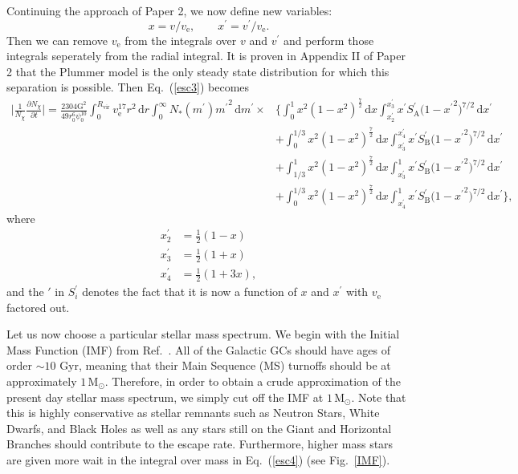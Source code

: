 \documentclass[aps,floatfix,prd,showpacs]{revtex4}
\newcommand{\diff}{\mathrm{d}}
\newcommand{\vesc}{v_{\text{e}}}
\newcommand{\vp}{v^\prime}
\newcommand{\mpr}{m^\prime}
\newcommand{\xp}{x^\prime}
\newcommand{\SA}{S_{\text{A}}}
\newcommand{\SB}{S_{\text{B}}}
\newcommand{\G}{\text{G}}
\newcommand{\Nx}{N_\chi}
\newcommand{\Rvir}{R_{\mathrm{vir}}}
\newcommand{\Msun}{\textrm{M}_\odot}
\begin{document}
Continuing the approach of Paper 2, we now define new variables: 
%
\begin{equation} 
	x = v/\vesc, \qquad \xp = \vp/\vesc.	
\end{equation}
%
%
Then we can remove $\vesc$ from the integrals over $v$ and $\vp$ and perform those integrals seperately from the radial integral.  It is proven in Appendix II of Paper 2 that the Plummer model is the only steady state distribution for which this separation is possible.  Then Eq.~(\ref{esc3}) becomes
%
\begin{equation}
\label{esc4}
\begin{split}
\bigg|\frac{1}{\Nx}\frac{\partial \Nx}{\partial t}\bigg| = \frac{2304\G^2}{49 r_0^6\psi_0^{10}}\int^{\Rvir}_0{\vesc^{17}r^2}\,\diff r\int^\infty_0{N_*(\mpr)\mpr}^2\,\diff \mpr \times &\Bigg\{ \int^1_0{x^2(1 - x^2)^\frac{7}{2}}\,\diff x\int^{\xp_3}_{\xp_2}{\xp \SA^\prime{(1-{\xp}^2})^{7/2}}\,\diff \xp \\
&+ \int^{1/3}_0{x^2(1 - x^2)^\frac{7}{2}}\,\diff x\int^{\xp_4}_{\xp_3} {\xp \SB^\prime{(1-{\xp}^2})^{7/2}}\,\diff \xp \\ &+ \int^1_{1/3}{x^2(1 - x^2)^\frac{7}{2}}\,\diff x\int^1_{x_3^\prime}{\xp \SB^\prime{(1-{\xp}^2})^{7/2}}\,\diff \xp \\
&+ \int^{1/3}_0{x^2(1 - {x}^2)^\frac{7}{2}}\,\diff x\int^1_{\xp_4}{\xp \SB^\prime{(1-{\xp}^2})^{7/2}}\,\diff \xp\Bigg\},
\end{split}
\end{equation}
%
%
where
%
\begin{equation}
\begin{split}
	\xp_2 &= \frac{1}{2}(1 - x) \\
	\xp_3 &= \frac{1}{2}(1 + x) \\
	\xp_4 &= \frac{1}{2}(1 + 3x),
\end{split}
\end{equation}
%
%
and the $\prime$ in $S_i^\prime$ denotes the fact that it is now a function of $x$ and $\xp$ with $\vesc$ factored out.

Let us now choose a particular stellar mass spectrum.  We begin with the Initial Mass Function (IMF) from Ref.~\cite{Kroupa2001}.  All of the Galactic GCs should have ages of order $\sim10$ Gyr, meaning that their Main Sequence (MS) turnoffs should be at approximately $1\, \Msun$.  Therefore, in order to obtain a crude approximation of the present day stellar mass spectrum, we simply cut off the IMF at $1\, \Msun$.  Note that this is highly conservative as stellar remnants such as Neutron Stars, White Dwarfs, and Black Holes as well as any stars still on the Giant and Horizontal Branches should contribute to the escape rate.  Furthermore, higher mass stars are given more wait in the integral over mass in Eq.~(\ref{esc4}) (see Fig.~\ref{IMF}).
\end{document}
